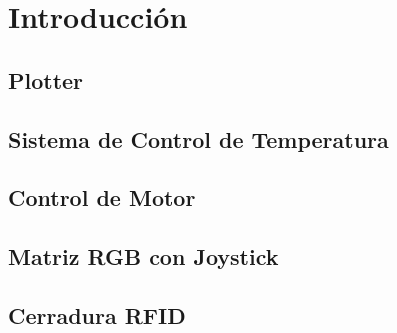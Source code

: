 \section{Introducción}

\subsection{Plotter}

\subsection{Sistema de Control de Temperatura}

\subsection{Control de Motor }

\subsection{Matriz RGB con Joystick}

\subsection{Cerradura RFID}